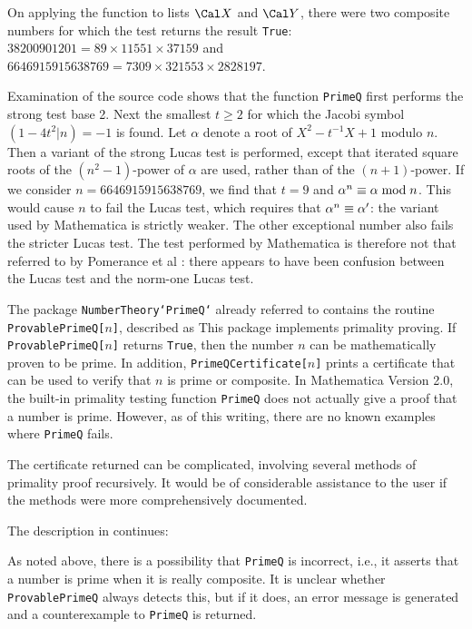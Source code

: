 On applying the function to lists $\sX$ and $\sY$,
there were two composite numbers for which
the test returns the result {\tt True}:  $38200901201 = 89 \times 11551 \times 37159$
and $6646915915638769 = 7309 \times 321553 \times 2828197$.

Examination of the source code shows that the function {\tt PrimeQ} first performs
the strong test base 2.
Next the smallest $t \ge 2$ for which the Jacobi symbol $(1 - 4t^2 | n) = -1$ is found.
Let $\alpha$ denote a root of $X^2 - t^{-1}X + 1$ modulo $n$.  
Then a variant of the strong Lucas test is performed, except that
iterated square roots of the $\left(n^2 - 1\right)$-power 
of $\alpha$ are used, rather than of the $\left(n + 1\right)$-power.  
If we consider $n = 6646915915638769$, we find that $t = 9$
and $\alpha^n \equiv \alpha \bmod n$.
This would cause $n$ to fail the Lucas test, which requires that
$\alpha^n \equiv \alpha'$: the variant used by Mathematica is
strictly weaker.  The other exceptional number also fails the stricter Lucas test.
The test performed by Mathematica is therefore not that referred to by Pomerance
et al \cite{34}: there appears to have been confusion between the
Lucas test and the norm-one Lucas test.

The package {\tt NumberTheory`PrimeQ`} already referred to contains the routine
{\tt ProvablePrimeQ[$n$]}, described \cite{13} as
\block
This package implements primality proving.  If {\tt ProvablePrimeQ[$n$]}
returns {\tt True}, then the number $n$ can be mathematically proven to be
prime. In addition, {\tt PrimeQCertificate[$n$]} prints a certificate that
can be used to verify that $n$ is prime or composite. In Mathematica
Version 2.0, the built-in primality testing function {\tt PrimeQ} does
not actually give a proof that a number is prime.  However, as of
this writing, there are no known examples where {\tt PrimeQ} fails.
\endblock

The certificate returned can be complicated, involving several
methods of primality proof recursively.  It would be of considerable
assistance to the user if the methods were more comprehensively documented.

The description in \cite{13} continues:

\block
As noted above, there is a possibility that {\tt PrimeQ} is incorrect,
i.e., it asserts that a number is prime when it is really composite.
It is unclear whether {\tt ProvablePrimeQ} always detects this, but if
it does, an error message is generated and a counterexample to
{\tt PrimeQ} is returned.
\endblock

